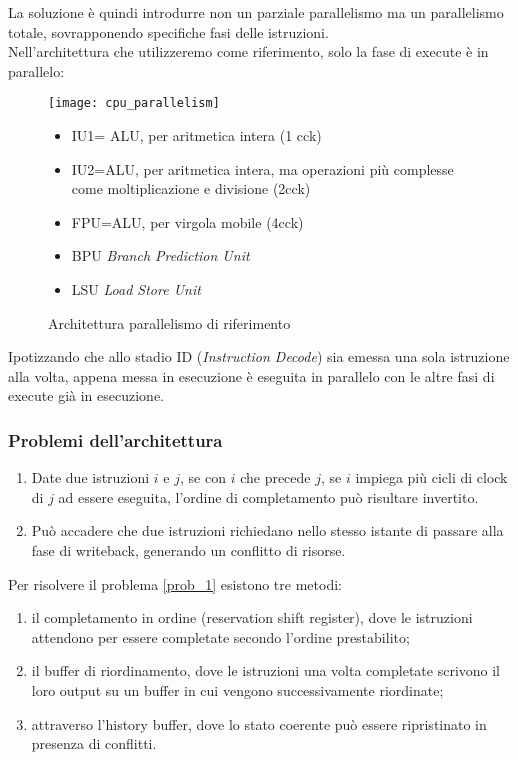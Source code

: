 \documentclass[../template]{subfiles}
\begin{document}
La soluzione è quindi introdurre non un parziale parallelismo ma un parallelismo totale, sovrapponendo specifiche fasi delle istruzioni.
\\
Nell'architettura che utilizzeremo come riferimento, solo la fase di execute è in parallelo:

\begin{figure}[h]
    \begin{minipage}{.5\textwidth}
        \centering
        \texttt{[image: cpu\_parallelism]}
    \end{minipage}
    \begin{minipage}{.45\textwidth}
        \begin{itemize}
            \item IU1= ALU, per aritmetica intera (1 cck)
            \item IU2=ALU, per aritmetica intera, ma operazioni più complesse come moltiplicazione e divisione (2cck)
            \item FPU=ALU, per virgola mobile (4cck)
            \item BPU \textit{Branch Prediction Unit}
            \item LSU \textit{Load Store Unit}
        \end{itemize}
    \end{minipage}
    \caption{Architettura parallelismo di riferimento}
\end{figure}

Ipotizzando che allo stadio ID (\textit{Instruction Decode}) sia emessa una sola istruzione alla volta, appena messa in esecuzione è eseguita in parallelo con le altre fasi di execute già in esecuzione.

\subsubsection{Problemi dell'architettura}
\begin{enumerate}
    \item \label{prob_1} Date due istruzioni $i$ e $j$, se con $i$ che precede $j$, se $i$ impiega più cicli di clock di $j$ ad essere eseguita,
        l'ordine di completamento può risultare invertito.
    \item \label{prob_2} Può accadere che due istruzioni richiedano nello stesso istante di passare alla fase di writeback, generando un conflitto di risorse.
\end{enumerate}

Per risolvere il problema \ref{prob_1} esistono tre metodi:
\begin{enumerate}
    \item il completamento in ordine (reservation shift register), dove le istruzioni attendono per essere completate secondo l'ordine prestabilito;
    \item il buffer di riordinamento, dove le istruzioni una volta completate scrivono il
loro output su un buffer in cui vengono successivamente riordinate;
    \item attraverso l'history buffer, dove lo stato
coerente può essere ripristinato in presenza di conflitti.
\end{enumerate}
\end{document}
